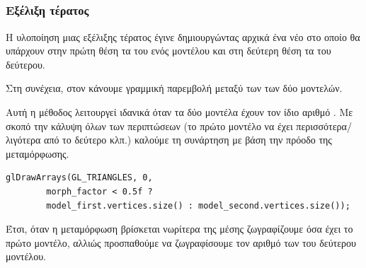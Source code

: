\documentclass[11pt]{scrartcl} %
\begin{document}
\subsection{}

\subsubsection{Εξέλιξη τέρατος}

Η υλοποίηση μιας εξέλιξης τέρατος έγινε δημιουργώντας αρχικά ένα νέο 
 στο οποίο θα υπάρχουν στην πρώτη θέση 
τα  του ενός μοντέλου και στη δεύτερη θέση τα 
 του δεύτερου. 

Στη συνέχεια, στον  κάνουμε γραμμική παρεμβολή 
μεταξύ των  των δύο μοντελών. 

Αυτή η μέθοδος λειτουργεί ιδανικά όταν τα δύο μοντέλα έχουν τον ίδιο 
αριθμό . Με σκοπό την κάλυψη όλων των περιπτώσεων 
(το πρώτο μοντέλο να έχει περισσότερα/λιγότερα  από 
το δεύτερο κλπ.) καλούμε τη συνάρτηση  με βάση την πρόοδο 
της μεταμόρφωσης.

\begin{minipage}{\textwidth}
    \begin{lstlisting}[caption=\textgreek{Κλήση συνάρτησης με βάση την πρόοδο της μεταμόρφωσης.}]
glDrawArrays(GL_TRIANGLES, 0, 
        morph_factor < 0.5f ? 
        model_first.vertices.size() : model_second.vertices.size());
\end{lstlisting}
\end{minipage}

Έτσι, όταν η μεταμόρφωση βρίσκεται νωρίτερα της μέσης ζωγραφίζουμε 
όσα  έχει το πρώτο μοντέλο, αλλιώς προσπαθούμε να ζωγραφίσουμε 
τον αριθμό των  του δεύτερου μοντέλου.

\end{document}
